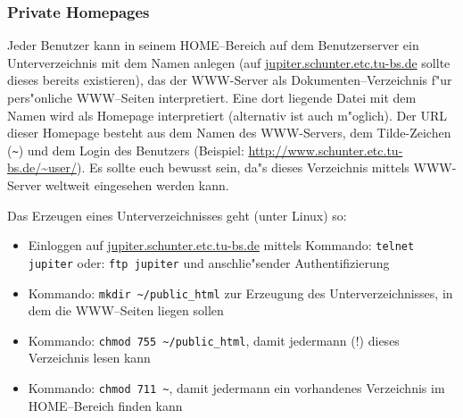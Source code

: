 



\subsubsection{Private Homepages}

Jeder Benutzer kann in seinem HOME--Bereich auf dem Benutzerserver ein
Unterverzeichnis mit dem Namen  anlegen (auf  
\url{jupiter.schunter.etc.tu-bs.de} sollte dieses bereits existieren), das der
\glossar WWW-Server als Do\-ku\-men\-ten--Verzeichnis f"ur pers"onliche \glossar
WWW--Seiten interpretiert. Eine dort liegende Datei mit dem Namen
 wird als \glossar Homepage interpretiert (alternativ ist
auch  m"oglich). Der URL dieser \glossar Homepage besteht aus
dem Namen des \glossar WWW-Servers, dem Tilde-Zeichen (\verb#~#) und dem Login
des Benutzers (Beispiel: \url{http://www.schunter.etc.tu-bs.de/~user/}). Es
sollte euch bewusst sein, da"s dieses Verzeichnis mittels \glossar WWW-Server
weltweit eingesehen werden kann.

Das Erzeugen eines Unterverzeichnisses  geht (unter Linux)
so:
\begin{itemize}
  \item Einloggen auf \url{jupiter.schunter.etc.tu-bs.de} mittels Kommando:
    \texttt{telnet jupiter} oder: \verb#ftp jupiter# und anschlie"sender
    \glossar Authentifizierung
  \item Kommando: \verb#mkdir ~/public_html# zur Erzeugung des
    Unterverzeichnisses, in dem die \glossar WWW--Seiten liegen sollen 
  \item Kommando: \verb#chmod 755 ~/public_html#, damit jedermann (!)
    dieses Verzeichnis lesen kann
  \item Kommando: \verb#chmod 711 ~#, damit jedermann ein vorhandenes
    Verzeichnis im HOME--Bereich finden kann
\end{itemize}

